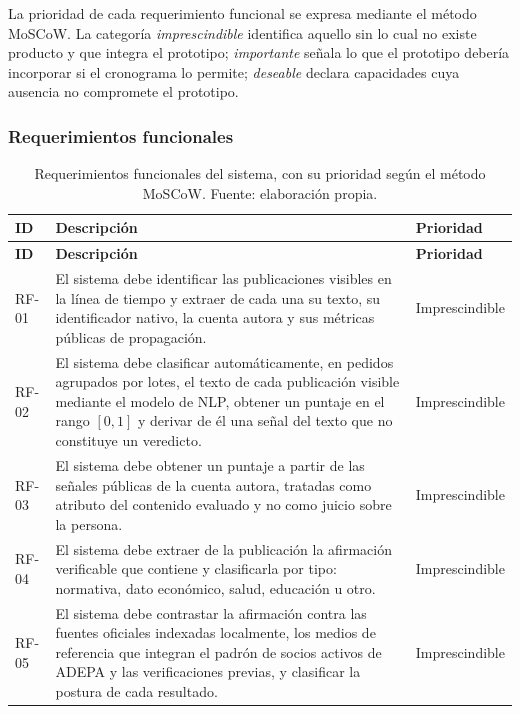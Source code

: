 La prioridad de cada requerimiento funcional se expresa mediante el método MoSCoW. La categoría \emph{imprescindible} identifica aquello sin lo cual no existe producto y que integra el prototipo; \emph{importante} señala lo que el prototipo debería incorporar si el cronograma lo permite; \emph{deseable} declara capacidades cuya ausencia no compromete el prototipo.

\subsubsection{Requerimientos funcionales}

\begin{small}
\begin{longtable}{@{}p{1.3cm} p{10.2cm} p{2.4cm}@{}}
  \caption{Requerimientos funcionales del sistema, con su prioridad según el método MoSCoW. Fuente: elaboración propia.}
  \label{tab:rf} \\
  \hline
  \textbf{ID} & \textbf{Descripción} & \textbf{Prioridad} \\
  \hline
  \endfirsthead
  \hline
  \textbf{ID} & \textbf{Descripción} & \textbf{Prioridad} \\
  \hline
  \endhead
  \hline
  \endfoot
  RF-01 & El sistema debe identificar las publicaciones visibles en la línea de tiempo y extraer de cada una su texto, su identificador nativo, la cuenta autora y sus métricas públicas de propagación. & Imprescindible \\
  RF-02 & El sistema debe clasificar automáticamente, en pedidos agrupados por lotes, el texto de cada publicación visible mediante el modelo de NLP, obtener un puntaje en el rango $[0,1]$ y derivar de él una señal del texto que no constituye un veredicto. & Imprescindible \\
  RF-03 & El sistema debe obtener un puntaje a partir de las señales públicas de la cuenta autora, tratadas como atributo del contenido evaluado y no como juicio sobre la persona. & Imprescindible \\
  RF-04 & El sistema debe extraer de la publicación la afirmación verificable que contiene y clasificarla por tipo: normativa, dato económico, salud, educación u otro. & Imprescindible \\
  RF-05 & El sistema debe contrastar la afirmación contra las fuentes oficiales indexadas localmente, los medios de referencia que integran el padrón de socios activos de ADEPA y las verificaciones previas, y clasificar la postura de cada resultado. & Imprescindible \\

\end{longtable}
\end{small}

